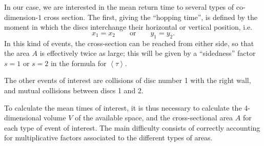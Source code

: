 \documentclass[superscriptaddress,pre,reprint,showpacs,onecolumn]{revtex4-1}
\newcommand{\mean}[1]{\left \langle #1 \right \rangle}
\newcommand{\vv}{\mathbf{v}}
\begin{document}
In our case, we are interested in the mean return time to 
several types of co-dimension-$1$ cross section.
The first, giving the ``hopping time'', 
is defined by the moment
in which the discs interchange their horizontal or vertical position, i.e.
\begin{equation} \label{condchoque}
x_1 = x_2  \qquad \text{or} \qquad y_1 = y_2.
\end{equation}
In this kind of events, the cross-section can be reached from either side, so that the area
$A$ is effectively twice as large; this will be given by a ``sidedness'' factor $s = 1$ or $s=2$ in the formula
for $\mean{\tau}$.

The other events of interest are collisions of disc number 1 with the right wall, and mutual
collisions between discs 1 and 2.
%


To calculate the mean times of interest, it is thus necessary to calculate
the 4-dimensional volume $V$ of the available space, and the cross-sectional area $A$ 
for each type of event of interest. The main difficulty consists of correctly accounting for multiplicative factors associated to the different 
types of areas.
%
%
\end{document}
